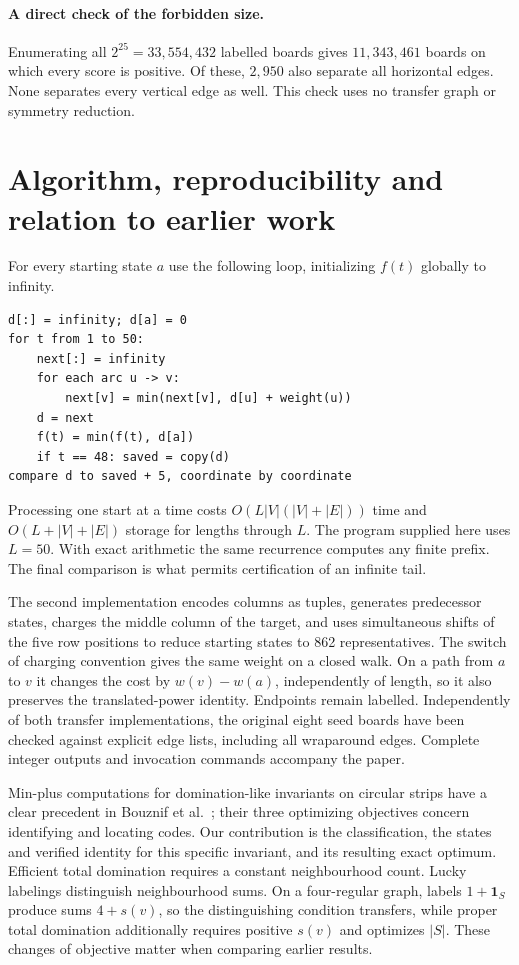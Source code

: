 \documentclass[11pt,a4paper]{article}
\begin{document}
\paragraph{A direct check of the forbidden size.} Enumerating all $2^{25}=33{,}554{,}432$ labelled boards gives $11{,}343{,}461$ boards on which every score is positive. Of these, $2{,}950$ also separate all horizontal edges. None separates every vertical edge as well. This check uses no transfer graph or symmetry reduction.

\enlargethispage{1.3\baselineskip}
\section{Algorithm, reproducibility and relation to earlier work}
For every starting state $a$ use the following loop, initializing $f(t)$ globally to infinity.
\begin{verbatim}
d[:] = infinity; d[a] = 0
for t from 1 to 50:
    next[:] = infinity
    for each arc u -> v:
        next[v] = min(next[v], d[u] + weight(u))
    d = next
    f(t) = min(f(t), d[a])
    if t == 48: saved = copy(d)
compare d to saved + 5, coordinate by coordinate
\end{verbatim}
Processing one start at a time costs $O(L |V|(|V|+|E|))$ time and $O(L+|V|+|E|)$ storage for lengths through $L$. The program supplied here uses $L=50$. With exact arithmetic the same recurrence computes any finite prefix. The final comparison is what permits certification of an infinite tail.

The second implementation encodes columns as tuples, generates predecessor states, charges the middle column of the target, and uses simultaneous shifts of the five row positions to reduce starting states to 862 representatives. The switch of charging convention gives the same weight on a closed walk. On a path from $a$ to $v$ it changes the cost by $w(v)-w(a)$, independently of length, so it also preserves the translated-power identity. Endpoints remain labelled. Independently of both transfer implementations, the original eight seed boards have been checked against explicit edge lists, including all wraparound edges. Complete integer outputs and invocation commands accompany the paper.

Min-plus computations for domination-like invariants on circular strips have a clear precedent in Bouznif et al.\ \cite{minplus}; their three optimizing objectives concern identifying and locating codes. Our contribution is the classification, the states and verified identity for this specific invariant, and its resulting exact optimum. Efficient total domination \cite{efficient} requires a constant neighbourhood count. Lucky labelings \cite{lucky} distinguish neighbourhood sums. On a four-regular graph, labels $1+\mathbf1_S$ produce sums $4+s(v)$, so the distinguishing condition transfers, while proper total domination additionally requires positive $s(v)$ and optimizes $|S|$. These changes of objective matter when comparing earlier results.
\end{document}
